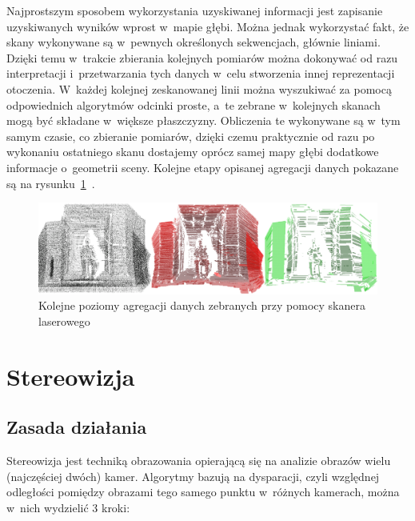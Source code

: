 Najprostszym sposobem wykorzystania uzyskiwanej informacji jest zapisanie
uzyskiwanych wyników wprost w~mapie głębi. Można jednak wykorzystać fakt, że
skany wykonywane są w~pewnych określonych sekwencjach, głównie liniami. Dzięki
temu w~trakcie zbierania kolejnych pomiarów można dokonywać od razu
interpretacji i~przetwarzania tych danych w~celu stworzenia innej reprezentacji
otoczenia. W~każdej kolejnej zeskanowanej linii można wyszukiwać za pomocą
odpowiednich algorytmów odcinki proste, a~te zebrane w~kolejnych skanach mogą
być składane w~większe płaszczyzny. Obliczenia te wykonywane są w~tym samym
czasie, co zbieranie pomiarów, dzięki czemu praktycznie od razu po wykonaniu
ostatniego skanu dostajemy oprócz samej mapy głębi dodatkowe informacje 
o~geometrii sceny. Kolejne etapy opisanej agregacji danych
pokazane są na rysunku~\ref{fig:laser_aggregate}~\cite{Surmann01a3d}.

\begin{figure}[h!]
\centering
\includegraphics[width=12cm]{../../Common/img/laser_aggregate}
\caption{Kolejne poziomy agregacji danych zebranych przy pomocy skanera
laserowego}
\label{fig:laser_aggregate}
\end{figure}

\section{Stereowizja}

\subsection{Zasada działania}

Stereowizja jest techniką obrazowania opierającą się na analizie obrazów wielu
(najczęściej dwóch) kamer. Algorytmy bazują na dysparacji, czyli względnej
odległości pomiędzy obrazami tego samego punktu w~różnych kamerach, można 
w~nich wydzielić 3 kroki:


